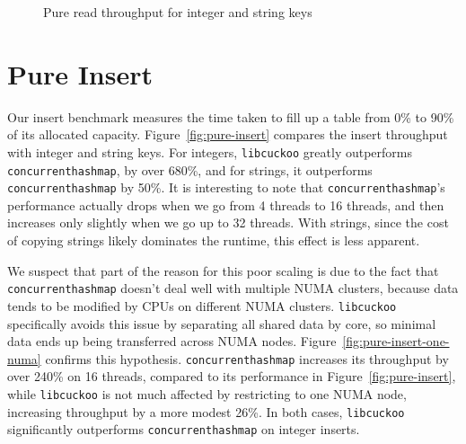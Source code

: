 \documentclass{article}
\newcommand{\tbbmap}{\texttt{concurrent\textunderscore hash\textunderscore map}}
\newcommand{\libcuckoo}{\texttt{libcuckoo}}
\begin{document}
\begin{figure}[!htbp]
  \centering
  \caption{Pure read throughput for integer and string keys}
  \label{fig:pure-read}
\end{figure}

\section*{Pure Insert}
Our insert benchmark measures the time taken to fill up a table from 0\% to 90\%
of its allocated capacity. Figure~\ref{fig:pure-insert} compares the insert
throughput with integer and string keys. For integers, {\libcuckoo} greatly
outperforms {\tbbmap}, by over 680\%, and for strings, it outperforms {\tbbmap}
by 50\%. It is interesting to note that {\tbbmap}'s performance actually drops
when we go from 4 threads to 16 threads, and then increases only slightly when
we go up to 32 threads. With strings, since the cost of copying strings likely
dominates the runtime, this effect is less apparent.

We suspect that part of the reason for this poor scaling is due to the fact that
{\tbbmap} doesn't deal well with multiple NUMA clusters, because data tends to
be modified by CPUs on different NUMA clusters. {\libcuckoo} specifically avoids
this issue by separating all shared data by core, so minimal data ends up being
transferred across NUMA nodes. Figure~\ref{fig:pure-insert-one-numa} confirms
this hypothesis. {\tbbmap} increases its throughput by over 240\% on 16 threads,
compared to its performance in Figure~\ref{fig:pure-insert}, while {\libcuckoo}
is not much affected by restricting to one NUMA node, increasing throughput by a
more modest 26\%. In both cases, {\libcuckoo} significantly outperforms
{\tbbmap} on integer inserts.
\end{document}
